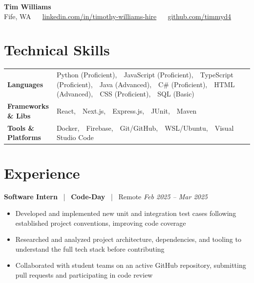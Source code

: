 \documentclass[10pt, letterpaper]{article}
\newcommand{\jobhead}[4]{%
  \vspace{5pt}%
  {\bfseries\color{dark}#1}%
  ~{\color{light}|}~%
  {\bfseries\color{navy}#2}%
  ~{\color{light}|}~%
  {\color{light}#3}%
  \hfill{\color{light}\small\textit{#4}}\\[-2pt]%
}
\newcommand{\skillrow}[2]{%
  {\bfseries #1} & #2 \\[2pt]%
}
\begin{document}

\begin{center}
  {\huge\bfseries\color{navy} Tim Williams}\\[4pt]
  {\small\color{light}
    Fife, WA
    ~\textbullet~
    \href{https://linkedin.com/in/timothy-williams-hire}{linkedin.com/in/timothy-williams-hire}
    ~\textbullet~
    \href{https://github.com/timmyd4}{github.com/timmyd4}
  }
\end{center}

\vspace{2pt}

\section{Technical Skills}

\begin{tabular}{@{}p{1.6in} p{5.2in}@{}}
  \skillrow{Languages}{Python (Proficient),\ \ JavaScript (Proficient),\ \ TypeScript (Proficient),\ \ Java (Advanced),\ \ C\# (Proficient),\ \ HTML (Advanced),\ \ CSS (Proficient),\ \ SQL (Basic)}
  \skillrow{Frameworks \& Libs}{React,\ \ Next.js,\ \ Express.js,\ \ JUnit,\ \ Maven}
  \skillrow{Tools \& Platforms}{Docker,\ \ Firebase,\ \ Git/GitHub,\ \ WSL/Ubuntu,\ \ Visual Studio Code}
\end{tabular}

\section{Experience}

\jobhead{Software Intern}{Code-Day}{Remote}{Feb 2025 – Mar 2025}
\begin{itemize}
  \item Developed and implemented new unit and integration test cases following established project conventions, improving code coverage
  \item Researched and analyzed project architecture, dependencies, and tooling to understand the full tech stack before contributing
  \item Collaborated with student teams on an active GitHub repository, submitting pull requests and participating in code review
\end{itemize}
\end{document}
